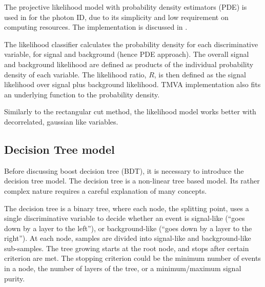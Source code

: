 The projective likelihood model with probability density estimators (PDE) is used in \pandora for the photon ID,  due to its simplicity and low requirement on computing resources. The \pandora implementation is discussed  in .

The likelihood classifier calculates the probability density for each discriminative variable, for signal and background (hence PDE approach). The overall signal and background likelihood are defined as products of the individual probability density of each variable. The likelihood ratio, $R$, is then defined as the signal likelihood over signal plus background likelihood. TMVA implementation also fits an underlying function to the probability density.


Similarly to the rectangular cut method, the likelihood model works better with decorrelated, gaussian like variables.



\subsection{Decision Tree model}
\label{sec:pandoraDecisionTree}

Before discussing boost decision tree (BDT), it is necessary to introduce the decision tree model. The decision tree is a non-linear tree based model. Its rather complex nature requires a careful explanation of many concepts.

The decision tree is a binary tree, where each node, the splitting point, uses a single discriminative variable to decide whether an event is signal-like (``goes down by a layer to the left''), or background-like (``goes down by a layer to the right''). At each node, samples are divided into signal-like and background-like sub-samples. The tree growing starts at the root node, and stops after certain criterion are met. The stopping criterion could be the minimum number of events in a node, the number of layers of the tree, or a minimum/maximum signal purity.

